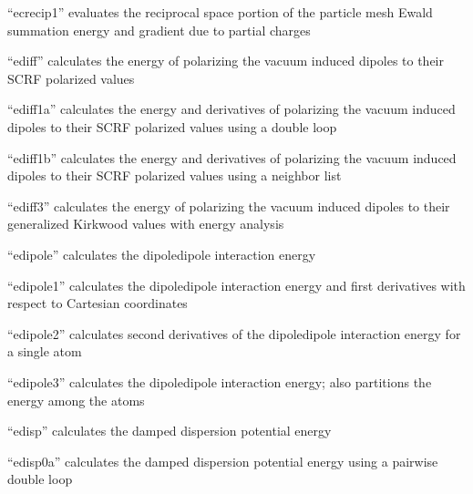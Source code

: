 \documentclass[letterpaper,11pt,english]{sphinxmanual}
\begin{document}

“ecrecip1” evaluates the reciprocal space portion of the particle
mesh Ewald summation energy and gradient due to partial charges


“ediff” calculates the energy of polarizing the vacuum induced
dipoles to their SCRF polarized values


“ediff1a” calculates the energy and derivatives of polarizing
the vacuum induced dipoles to their SCRF polarized values using
a double loop


“ediff1b” calculates the energy and derivatives of polarizing
the vacuum induced dipoles to their SCRF polarized values using
a neighbor list


“ediff3” calculates the energy of polarizing the vacuum induced
dipoles to their generalized Kirkwood values with energy analysis


“edipole” calculates the dipole\sphinxhyphen{}dipole interaction energy


“edipole1” calculates the dipole\sphinxhyphen{}dipole interaction energy
and first derivatives with respect to Cartesian coordinates


“edipole2” calculates second derivatives of the
dipole\sphinxhyphen{}dipole interaction energy for a single atom


“edipole3” calculates the dipole\sphinxhyphen{}dipole interaction energy;
also partitions the energy among the atoms


“edisp” calculates the damped dispersion potential energy


“edisp0a” calculates the damped dispersion potential energy
using a pairwise double loop

\end{document}

